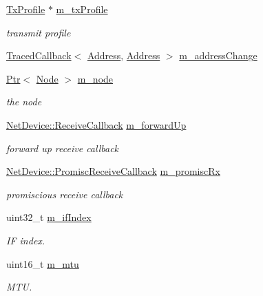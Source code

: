 \begin{DoxyCompactItemize}
\hyperlink{structns3_1_1TxProfile}{Tx\+Profile} $\ast$ \hyperlink{classns3_1_1WaveNetDevice_ac541d171fef0d8f5c070e305a3e02bca}{m\+\_\+tx\+Profile}
\begin{DoxyCompactList}\small\item\em transmit profile \end{DoxyCompactList}\item 
\hyperlink{classns3_1_1TracedCallback}{Traced\+Callback}$<$ \hyperlink{classns3_1_1Address}{Address}, \hyperlink{classns3_1_1Address}{Address} $>$ \hyperlink{classns3_1_1WaveNetDevice_a9f5269cddc734b4dddff1e96f577a28f}{m\+\_\+address\+Change}
\item 
\hyperlink{classns3_1_1Ptr}{Ptr}$<$ \hyperlink{classns3_1_1Node}{Node} $>$ \hyperlink{classns3_1_1WaveNetDevice_ac48a992182b2920c3889706e76e78f79}{m\+\_\+node}
\begin{DoxyCompactList}\small\item\em the node \end{DoxyCompactList}\item 
\hyperlink{classns3_1_1NetDevice_ad5e5e1ca187472bc2ba99575d8def568}{Net\+Device\+::\+Receive\+Callback} \hyperlink{classns3_1_1WaveNetDevice_a323fd8350ab01fa9fa0b4a2ec6b32442}{m\+\_\+forward\+Up}
\begin{DoxyCompactList}\small\item\em forward up receive callback \end{DoxyCompactList}\item 
\hyperlink{classns3_1_1NetDevice_a427225795919f26c414bee2ea3f31ed2}{Net\+Device\+::\+Promisc\+Receive\+Callback} \hyperlink{classns3_1_1WaveNetDevice_aa240cecb622b251bbab6177554e9d439}{m\+\_\+promisc\+Rx}
\begin{DoxyCompactList}\small\item\em promiscious receive callback \end{DoxyCompactList}\item 
uint32\+\_\+t \hyperlink{classns3_1_1WaveNetDevice_a6b8a6a87173e27fc9bdcbb45e1e395bd}{m\+\_\+if\+Index}
\begin{DoxyCompactList}\small\item\em IF index. \end{DoxyCompactList}\item 
uint16\+\_\+t \hyperlink{classns3_1_1WaveNetDevice_a203a4cd4350be439a2cb5dd45f02c383}{m\+\_\+mtu}
\begin{DoxyCompactList}\small\item\em M\+TU. \end{DoxyCompactList}\end{DoxyCompactItemize}
